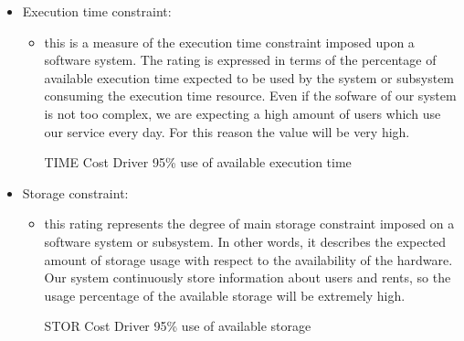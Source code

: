 \begin{itemize}
	\item Execution time constraint: 
	\begin{itemize}
	\item[] this is a measure of the execution time constraint imposed upon a software system. The rating is expressed in terms of the percentage of available execution time expected to be used by the system or subsystem consuming the execution time resource. Even if the sofware of our system is not too complex, we are expecting a high amount of users which use our service every day. For this reason the value will be very high.
	\begin{costdriverstable}{TIME Cost Driver}
		 {95\% use of available execution time}\hline
	\end{costdriverstable}
	\end{itemize}
\end{itemize}

\begin{itemize}
	\item Storage constraint: 
	\begin{itemize}
	\item[] this rating represents the degree of main storage constraint imposed on a software system or subsystem. In other words, it describes the expected amount of storage usage with respect to the availability of the hardware. Our system continuously store information about users and rents, so the usage percentage of the available storage will be extremely high.
	\begin{costdriverstable}{STOR Cost Driver}
		 {95\% use of available storage}\hline
	\end{costdriverstable}
	\end{itemize}
\end{itemize}

\vspace{2em}

